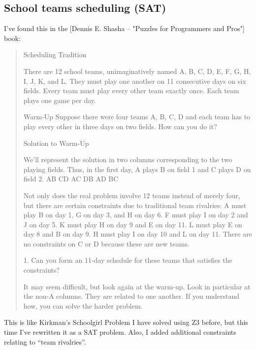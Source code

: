 \subsection{School teams scheduling (SAT)}

I've found this in the [Dennis E. Shasha -- "Puzzles for Programmers and Pros"] book:

\begin{framed}
\begin{quotation}
Scheduling Tradition

There are 12 school teams, unimaginatively named A, B, C, D, E, F, G, H, I, J, K, and L. They must play one another on 11 consecutive days on six fields. 
Every team must play every other team exactly once. Each team plays one game per day.

        Warm-Up
                Suppose there were four teams A, B, C, D and each team has to play every other in three days on two fields. How can you do it?

        Solution to Warm-Up

                We’ll represent the solution in two columns corresponding to the two playing fields. Thus, in the first day, A plays B on field 1 and C plays D on field 2.
                AB CD
                AC DB
                AD BC

Not only does the real problem involve 12 teams instead of merely four, but there are certain constraints due to traditional team rivalries: 
A must play B on day 1, G on day 3, and H on day 6. F must play I on day 2 and J on day 5.  K must play H on day 9 and E on day 11. 
L must play E on day 8 and B on day 9. H must play I on day 10 and L on day 11. There are no constraints on C or D because these are new teams.

        1. Can you form an 11-day schedule for these teams that satisfies the constraints?

It may seem difficult, but look again at the warm-up. Look in particular at the non-A columns. They are related to one another.
If you understand how, you can solve the harder problem.
\end{quotation}
\end{framed}

This is like Kirkman's Schoolgirl Problem I have solved using Z3 before, but this time I've rewritten it as a SAT problem.
Also, I added additional constraints relating to ``team rivalries''.



